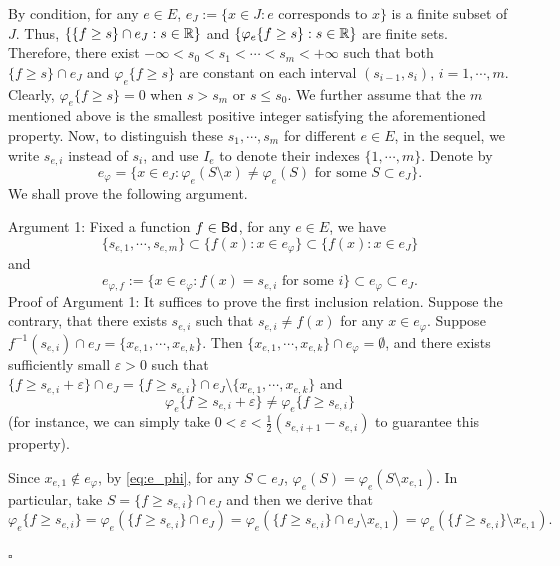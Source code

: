 \documentclass[12pt,a4paper]{article}
\newenvironment{proof}{\medskip\noindent{\bf Proof. }}{\hfill$\square$\medskip}
\begin{document}
\begin{proof}
By condition, for any $e\in E$, $e_J:=\{x\in J:e\text{ corresponds to }x\}$ is a finite subset of $J$. 
Thus, $\{\{f\ge s\}\cap e_J:s\in \mathbb{R}\}$ and 
$\{\varphi_e\{f\ge s\}:s\in \mathbb{R}\}$ are finite sets. Therefore, there exist $-\infty<s_0 < s_1< \cdots< s_m< +\infty%
$ such that both $\{f\ge s\}\cap e_J$ and $\varphi_e\{f\ge s\}$ are constant on each interval $(s_{i-1},s_i)$, $i=1,\cdots,m$. Clearly, $\varphi_e\{f\ge s\}=0$ when $s> s_m$ or $s\le s_0$. %
We further assume that the $m$ mentioned above is the smallest positive integer satisfying the aforementioned property. 
Now, to distinguish these $s_1,\cdots,s_m$ for different $e\in E$, in the sequel, we write $s_{e,i}$ instead of $s_i$, and use $I_e$ to denote their indexes $\{1,\cdots,m\}$. \;\;
Denote by
\begin{equation}\label{eq:e_phi}
e_\varphi=\{x\in e_J:\varphi_e(S\setminus x)\ne \varphi_e(S)\text{ for some }S\subset e_J\}.    
\end{equation}
We shall prove the following argument. 

Argument 1: Fixed a function $f\in{\sf Bd}$, for any $e\in E$, we have
$$\{s_{e,1},\cdots,s_{e,m}\}\subset \{f(x):x\in e_\varphi\}\subset \{f(x):x\in e_J\} $$
and %
$$e_{\varphi,f}:=\{x\in e_\varphi:f(x)=s_{e,i}\text{ for some }i\}\subset e_\varphi\subset e_J.$$
Proof of Argument 1: It suffices to prove the first inclusion relation. Suppose the contrary, that there exists $s_{e,i}$ such that $s_{e,i}\ne f(x)$ for any $x\in e_\varphi$. 
Suppose $f^{-1}(s_{e,i})\cap e_J=\{x_{e,1},\cdots,x_{e,k}\}$. Then $\{x_{e,1},\cdots,x_{e,k}\}\cap e_\varphi=\emptyset$, and there exists sufficiently small $\varepsilon>0$ such that $\{f\ge s_{e,i}+\varepsilon\}\cap e_J=\{f\ge s_{e,i}\}\cap e_J\setminus\{x_{e,1},\cdots,x_{e,k}\}$ and 
\begin{equation}\label{eq:s_e,i-ne-+}
\varphi_e\{f\ge s_{e,i}+\varepsilon\}\ne \varphi_e\{f\ge s_{e,i}\}    
\end{equation} (for instance, we can simply take $0<\varepsilon<\frac12 (s_{e,i+1}-s_{e,i})$ to guarantee‌ this property). 

Since $x_{e,1}\not\in e_\varphi$, by \eqref{eq:e_phi}, for any $S\subset e_J$, $\varphi_e(S)=\varphi_e(S\setminus x_{e,1})$. In particular, take $S=\{f\ge s_{e,i}\}\cap e_J$ and then we derive that 
$$\varphi_e\{f\ge s_{e,i}\}=\varphi_e(\{f\ge s_{e,i}\}\cap e_J)=\varphi_e(\{f\ge s_{e,i}\}\cap e_J\setminus x_{e,1})=\varphi_e(\{f\ge s_{e,i}\} \setminus x_{e,1}).$$ 


\end{proof}
\end{document}

